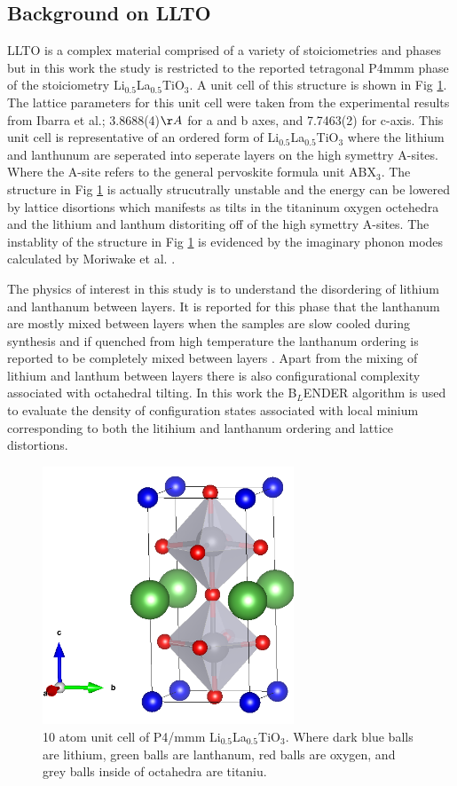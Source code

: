 \documentclass[aps,prl,reprint,superscriptaddress,showkeys]{revtex4-1}
\begin{document}
\subsection{Background on LLTO}
LLTO is a complex material comprised of a variety of stoiciometries and phases but in this work the study is restricted to the reported tetragonal P4mmm phase of the stoiciometry Li$_{0.5}$La$_{0.5}$TiO$_{3}$\cite{LLTOreview,P4mmmstrucuture}. A unit cell of this structure is shown in Fig \ref{LLTO_unit_cell}. The lattice parameters for this unit cell were taken from the experimental results from Ibarra et al.\cite{P4mmmstrucuture}; 3.8688(4)$\AA$ for a and b axes, and 7.7463(2) for c-axis.  This unit cell is representative of an ordered form of Li$_{0.5}$La$_{0.5}$TiO$_{3}$ where the lithium and lanthunum are seperated into seperate layers on the high symettry A-sites. Where the A-site refers to the general pervoskite formula unit ABX$_3$.  The structure in Fig \ref{LLTO_unit_cell} is actually strucutrally unstable and the energy can be lowered by lattice disortions which manifests as tilts in the titaninum oxygen octehedra and the lithium and lanthum distoriting off of the high symettry A-sites. The instablity of the structure in Fig \ref{LLTO_unit_cell} is evidenced by the imaginary phonon modes calculated by Moriwake et al. \cite{imaginary_phonons}.  

The physics of interest in this study is to understand the disordering of lithium and lanthanum between layers.  It is reported for this phase that the lanthanum are mostly mixed between layers when the samples are slow cooled during synthesis and if quenched from high temperature the lanthanum ordering is reported to be completely mixed between layers \cite{P4mmmstrucuture}. Apart from the mixing of lithium and lanthum between layers there is also configurational complexity associated with octahedral tilting. In this work the B$_L$ENDER algorithm is used to evaluate the density of configuration states associated with local minium corresponding to both the litihium and lanthanum ordering and lattice distortions.   
\begin{figure}[h!]
\includegraphics[width=7.5cm]{./figures/unit_cell_P4mmm_cropped.png}
\caption{10 atom unit cell of P4/mmm Li$_{0.5}$La$_{0.5}$TiO$_{3}$. Where dark blue balls are lithium, green balls are lanthanum, red balls are oxygen, and grey balls inside of octahedra are titaniu.\label{LLTO_unit_cell}}
\end{figure}
\end{document}
